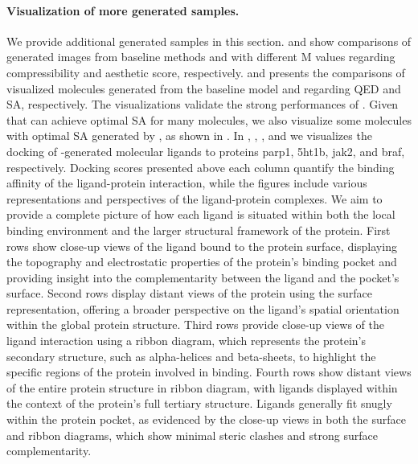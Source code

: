 \paragraph{Visualization of more generated samples.} 

We provide additional generated samples in this section.  and  show comparisons of generated images from baseline methods and {\alg} with different M values regarding compressibility and aesthetic score, respectively.  and  presents the comparisons of visualized molecules generated from the baseline model and {\alg} regarding QED and SA, respectively. The visualizations validate the strong performances of {\alg}. Given that {\alg} can achieve optimal SA for many molecules, we also visualize some molecules with optimal SA generated by {\alg}, as shown in . In , , , and  we visualizes the docking of \alg-generated molecular ligands to proteins parp1, 5ht1b, jak2, and braf, respectively. Docking scores presented above each column quantify the binding affinity of the ligand-protein interaction, while the figures include various representations and perspectives of the ligand-protein complexes.
We aim to provide a complete picture of how each ligand is situated within both the local binding environment and the larger structural framework of the protein.
First rows show close-up views of the ligand bound to the protein surface, displaying the topography and electrostatic properties of the protein's binding pocket and providing insight into the complementarity between the ligand and the pocket's surface. Second rows display distant views of the protein using the surface representation, offering a broader perspective on the ligand's spatial orientation within the global protein structure. Third rows provide close-up views of the ligand interaction using a ribbon diagram, which represents the protein's secondary structure, such as alpha-helices and beta-sheets, to highlight the specific regions of the protein involved in binding. Fourth rows show distant views of the entire protein structure in ribbon diagram, with ligands displayed within the context of the protein’s full tertiary structure.
Ligands generally fit snugly within the protein pocket, as evidenced by the close-up views in both the surface and ribbon diagrams, which show minimal steric clashes and strong surface complementarity. 


